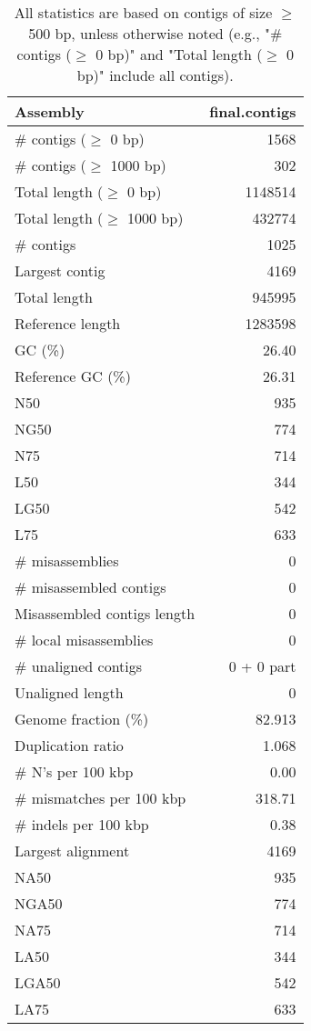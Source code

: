 \documentclass[12pt,a4paper]{article}
\begin{document}
\begin{table}[ht]
\begin{center}
\caption{All statistics are based on contigs of size $\geq$ 500 bp, unless otherwise noted (e.g., "\# contigs ($\geq$ 0 bp)" and "Total length ($\geq$ 0 bp)" include all contigs).}
\begin{tabular}{|l*{1}{|r}|}
\hline
Assembly & final.contigs \\ \hline
\# contigs ($\geq$ 0 bp) & 1568 \\ \hline
\# contigs ($\geq$ 1000 bp) & 302 \\ \hline
Total length ($\geq$ 0 bp) & 1148514 \\ \hline
Total length ($\geq$ 1000 bp) & 432774 \\ \hline
\# contigs & 1025 \\ \hline
Largest contig & 4169 \\ \hline
Total length & 945995 \\ \hline
Reference length & 1283598 \\ \hline
GC (\%) & 26.40 \\ \hline
Reference GC (\%) & 26.31 \\ \hline
N50 & 935 \\ \hline
NG50 & 774 \\ \hline
N75 & 714 \\ \hline
L50 & 344 \\ \hline
LG50 & 542 \\ \hline
L75 & 633 \\ \hline
\# misassemblies & 0 \\ \hline
\# misassembled contigs & 0 \\ \hline
Misassembled contigs length & 0 \\ \hline
\# local misassemblies & 0 \\ \hline
\# unaligned contigs & 0 + 0 part \\ \hline
Unaligned length & 0 \\ \hline
Genome fraction (\%) & 82.913 \\ \hline
Duplication ratio & 1.068 \\ \hline
\# N's per 100 kbp & 0.00 \\ \hline
\# mismatches per 100 kbp & 318.71 \\ \hline
\# indels per 100 kbp & 0.38 \\ \hline
Largest alignment & 4169 \\ \hline
NA50 & 935 \\ \hline
NGA50 & 774 \\ \hline
NA75 & 714 \\ \hline
LA50 & 344 \\ \hline
LGA50 & 542 \\ \hline
LA75 & 633 \\ \hline
\end{tabular}
\end{center}
\end{table}
\end{document}
